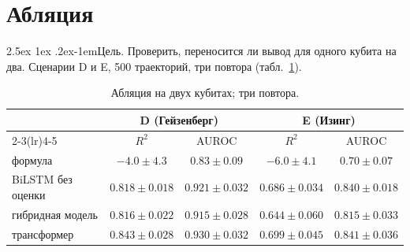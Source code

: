 \documentclass[12pt,a4paper]{report}
\makeatletter
\renewcommand\paragraph{\@startsection{paragraph}{4}{\z@}%
  {2.5ex \@plus1ex \@minus.2ex}{-1em}{\normalfont\normalsize\bfseries}}
\numberwithin{equation}{chapter}
\makeatother
\begin{document}
\section{Абляция}

\paragraph{Цель.} Проверить, переносится ли вывод для одного кубита на два.
Сценарии D и E, 500 траекторий, три повтора (табл.~\ref{tab:e6a}).

\begin{table}[h]
\centering
\caption{Абляция на двух кубитах; три повтора.}
\label{tab:e6a}
\small
\begin{tabular}{@{}lcccc@{}}
\toprule
 & \multicolumn{2}{c}{D (Гейзенберг)} & \multicolumn{2}{c}{E (Изинг)} \\
\cmidrule(lr){2-3}\cmidrule(lr){4-5}
 & $R^2$ & AUROC & $R^2$ & AUROC \\
\midrule
формула & $-4.0\pm4.3$ & $0.83\pm0.09$ & $-6.0\pm4.1$ & $0.70\pm0.07$ \\
BiLSTM без оценки & $0.818\pm0.018$ & $0.921\pm0.032$ & $0.686\pm0.034$ & $0.840\pm0.018$ \\
гибридная модель & $0.816\pm0.022$ & $0.915\pm0.028$ & $0.644\pm0.060$ & $0.815\pm0.033$ \\
трансформер & $\mathbf{0.843\pm0.028}$ & $\mathbf{0.930\pm0.032}$ & $\mathbf{0.699\pm0.045}$ & $\mathbf{0.841\pm0.036}$ \\
\bottomrule
\end{tabular}
\end{table}
\end{document}
